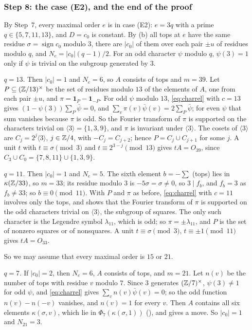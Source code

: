 \subsubsection*{Step 8: the case (E2), and the end of the proof}
By Step~7, every maximal order $e$ is in case (E2): $e=3q$ with a prime
$q\in\{5,7,11,13\}$, and $D=c_{0}$ is constant. By (b) all
tops at $e$ have the same residue $\sigma=\operatorname{sign}c_{0}$ modulo
$3$, there are $|c_{0}|$ of them over each pair $\pm u$ of residues modulo
$q$, and $N_{e}=|c_{0}|(q-1)/2$. For an odd character $\psi$ modulo $q$,
$\psi(3)=1$ only if $\psi$ is trivial on the subgroup generated by $3$.

\emph{$q=13$.} Then $|c_{0}|=1$ and $N_{e}=6$, so $A$ consists of tops and
$m=39$. Let $P\subseteq(\mathbb{Z}/13)^{\times}$ be the set of residues modulo $13$
of the elements of $A$, one from each pair $\pm u$, and
$\pi=\mathbf 1_{P}-\mathbf 1_{-P}$. For odd $\psi$ modulo $13$,
\eqref{eq:charrel} with $c=13$ gives $(1-\psi(3))\sum_{P}\bar\psi=0$, and
$\sum_{v}\pi(v)\bar\psi(v)=2\sum_{P}\bar\psi$; for even $\psi$ that sum
vanishes because $\pi$ is odd. So the Fourier transform of $\pi$ is supported
on the characters trivial on $\langle3\rangle=\{1,3,9\}$, and $\pi$ is
invariant under $\langle3\rangle$. The cosets of $\langle3\rangle$ are
$C_{j}=2^{j}\langle3\rangle$, $j\in\mathbb{Z}/4$, with $-C_{j}=C_{j+2}$; hence
$P=C_{j}\cup C_{j+1}$ for some $j$. A unit $t$ with $t\equiv\sigma\pmod3$ and
$t\equiv2^{3-j}\pmod{13}$ gives $tA=O_{39}$, since $C_{3}\cup C_{0}=
\{7,8,11\}\cup\{1,3,9\}$.

\emph{$q=11$.} Then $|c_{0}|=1$ and $N_{e}=5$. The sixth element $b=-\sum$
(tops) lies in $\kappa(\mathbb{Z}/33)$, so $m=33$; its residue modulo $3$ is
$-5\sigma=\sigma\ne0$, so $3\mid f_{b}$, and $f_{b}=3$ as $f_{b}\ne33$; so
$b\equiv0\pmod{11}$. With $P$ and $\pi$ as before, \eqref{eq:charrel} with
$c=11$ involves only the tops, and shows that the Fourier transform of $\pi$
is supported on the odd characters trivial on $\langle3\rangle$, the
subgroup of squares. The only such character is the Legendre symbol
$\lambda_{11}$, which is odd; so $\pi=\pm\lambda_{11}$, and $P$ is the set of
nonzero squares or of nonsquares. A unit $t\equiv\sigma\pmod3$, $t\equiv\pm1
\pmod{11}$ gives $tA=O_{33}$.

So we may assume that every maximal order is $15$ or $21$.

\emph{$q=7$.} If $|c_{0}|=2$, then $N_{e}=6$, $A$ consists of tops, and
$m=21$. Let $n(v)$ be the number of tops with residue $v$ modulo $7$.
Since $3$ generates $(\mathbb{Z}/7)^{\times}$, $\psi(3)\ne1$ for odd $\psi$, and
\eqref{eq:charrel} gives $\sum_{v}n(v)\bar\psi(v)=0$; so the odd function
$n(v)-n(-v)$ vanishes, and $n(v)=1$ for every $v$. Then $A$ contains all six
elements $\kappa(\sigma,v)$, which lie in $\Phi_{7}(\kappa(\sigma,1))$
(), and  gives a move. So $|c_{0}|=1$
and $N_{21}=3$.

